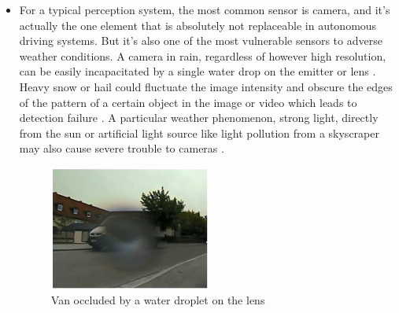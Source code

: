 \documentclass[rnd]{mas_proposal}
\begin{document}
\begin{itemize}
      \item For a typical perception system, the most common sensor is camera, and it's actually the one element that is absolutely not replaceable in autonomous driving systems. But it's also one of the most vulnerable sensors to adverse weather conditions. A camera in rain, regardless of however high resolution, can be easily incapacitated by a single water drop on the emitter or lens \cite{mardirosian2021LiDAR}. Heavy snow or hail could fluctuate the image intensity and obscure the edges of the pattern of a certain object in the image or video which leads to detection failure \cite{zang2019impact}. A particular weather phenomenon, strong light, directly from the sun or artificial light source like light pollution from a skyscraper may also cause severe trouble to cameras \cite{acarballo2020libre}.
            \begin{figure}[h]
                  \centering
                  \includegraphics[width=0.5\textwidth]{images/rain_droplet.png}
                  \caption{Van occluded by a water droplet on the lens \cite{Nobis2020May}}
                  \label{fig:camera_in_rain}
            \end{figure}


\end{itemize}
\end{document}
